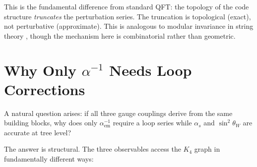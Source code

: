 \documentclass[11pt,a4paper]{article}
\theoremstyle{definition}
\begin{document}
This is the fundamental difference from standard QFT: the topology of the code structure \emph{truncates} the perturbation series. The truncation is topological (exact), not perturbative (approximate). This is analogous to modular invariance in string theory \cite{Polchinski1998v1}, though the mechanism here is combinatorial rather than geometric.

\section{Why Only $\alpha^{-1}$ Needs Loop Corrections}
\label{sec:why_only_alpha}

A natural question arises: if all three gauge couplings derive from the same building blocks, why does only $\alpha^{-1}_{\text{em}}$ require a loop series while $\alpha_s$ and $\sin^2\theta_W$ are accurate at tree level?

The answer is structural. The three observables access the $K_4$ graph in fundamentally different ways:
\end{document}
